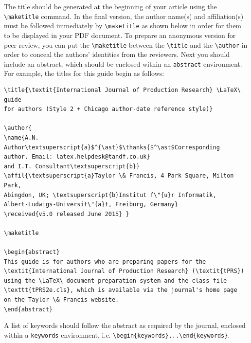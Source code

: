 \documentclass{tPRS2e}
\begin{document}
The title should be generated at the beginning of your article using the \verb"\maketitle" command.
In the final version, the author name(s) and affiliation(s) must be followed immediately by \verb"\maketitle" as shown below in order for them to be displayed in your PDF document.
To prepare an anonymous version for peer review, you can put the \verb"\maketitle" between the \verb"\title" and the \verb"\author" in order to conceal the authors' identities from the reviewers.
Next you should include an abstract, which should be enclosed within an \texttt{abstract} environment.
For example, the titles for this guide begin as follows:
\begin{verbatim}
\title{\textit{International Journal of Production Research} \LaTeX\ guide
for authors (Style 2 + Chicago author-date reference style)}

\author{
\name{A.N. Author\textsuperscript{a}$^{\ast}$\thanks{$^\ast$Corresponding
author. Email: latex.helpdesk@tandf.co.uk}
and I.T. Consultant\textsuperscript{b}}
\affil{\textsuperscript{a}Taylor \& Francis, 4 Park Square, Milton Park,
Abingdon, UK; \textsuperscript{b}Institut f\"{u}r Informatik,
Albert-Ludwigs-Universit\"{a}t, Freiburg, Germany}
\received{v5.0 released June 2015} }

\maketitle

\begin{abstract}
This guide is for authors who are preparing papers for the
\textit{International Journal of Production Research} (\textit{tPRS})
using the \LaTeX\ document preparation system and the class file
\texttt{tPRS2e.cls}, which is available via the journal's home page
on the Taylor \& Francis website.
\end{abstract}
\end{verbatim}
A list of keywords should follow the abstract as required by the journal, enclosed within a \texttt{keywords} environment, i.e. \verb"\begin{keywords}...\end{keywords}".
\end{document}
